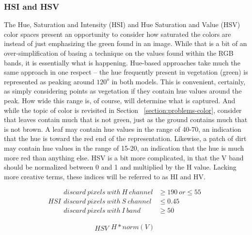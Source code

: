 \documentclass[agriculture,article,submit,pdftex,moreauthors]{Definitions/mdpi}
\begin{document}
\subsubsection{HSI and HSV}
The Hue, Saturation and Intensity (HSI) and Hue Saturation and Value (HSV) color spaces present an opportunity to consider how saturated the colors are instead of just emphasizing the green found in an image. While that is a bit of an over-simplification of basing a technique on the values found within the RGB bands, it is essentially what is happening. Hue-based approaches take much the same approach in one respect -- the hue frequently present in vegetation (green) is represented as peaking around $120^o$ in both models. This is convenient, certainly, as simply considering points as vegetation if they contain hue values around the peak. How wide this range is, of course, will determine what is captured. And while the topic of color is revisited in Section ~\ref{section:problems-color}, consider that leaves contain much that is not green, just as the ground contains much that is not brown. A leaf may contain hue values in the range of 40-70, an indication that the hue is toward the red end of the representation. Likewise, a patch of dirt may contain hue values in the range of 15-20, an indication that the hue is much more red than anything else. HSV is a bit more complicated, in that the V band should be normalized between 0 and 1 and multiplied by the H value. Lacking more creative terms, these indices will be referred to as HI and HV. 

\begin{equation}
	\label{equation:hsi}
	HSI
    \begin{split}
		discard~pixels~with~H~channel &\geq 190~or \leq 55\\
		discard~pixels~with~S~channel &\leq 0.45 \\
		discard~pixels~with~I~band &\geq 50
    \end{split}
\end{equation}

\begin{equation}
	\label{equation:hsv}
	HSV
	\begin{split}
		H * norm(V) \\
	\end{split}
\end{equation}
\end{document}
